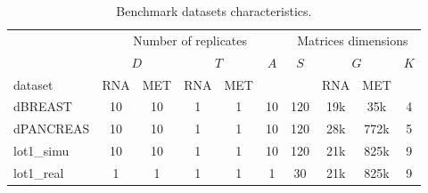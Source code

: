 \begin{table}[ht]
\centering
\caption{Benchmark datasets characteristics.}
\label{tab:datasets_detail}
\begin{tabular}{l|c|c|c|c|c|c|c|c|c}
& \multicolumn{5}{c|}{Number of replicates} & \multicolumn{4}{c}{Matrices dimensions} \\ \hhline{~|---------|}
& \multicolumn{2}{c|}{$D$} & \multicolumn{2}{c|}{$T$} & \multirow{2}{*}{$A$} & \multirow{2}{*}{$S$} & \multicolumn{2}{c|}{$G$} & \multirow{2}{*}{$K$} \\ \hhline{~|--|--|~~|--|~|}
dataset & RNA & MET & RNA & MET & & & RNA & MET & \\ \hline
dBREAST & 10 & 10 & 1 & 1 & 10 & 120 & 19k & 35k & 4 \\
dPANCREAS & 10 & 10 & 1 & 1 & 10 & 120 & 28k & 772k & 5  \\
lot1\_simu & 10 & 10 & 1 & 1 & 10 & 120 & 21k & 825k & 9  \\
lot1\_real & 1 & 1 & 1 & 1 & 1 & 30 & 21k & 825k & 9 
\end{tabular}
\end{table}